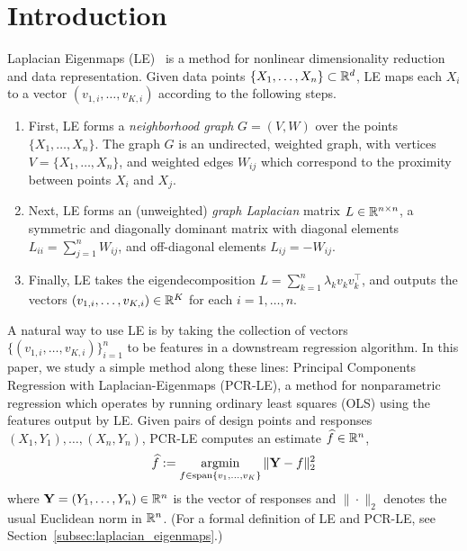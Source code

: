 \section{Introduction}
\label{sec:introduction}

Laplacian Eigenmaps (LE)~\citep{belkin03a} is a method for nonlinear dimensionality reduction and data representation. Given data points $\{X_1,\ldots,X_n\} \subset \mathbb{R}^d$, LE maps each $X_i$ to a vector $(v_{1,i},\ldots,v_{K,i})$ according to the following steps.
\begin{enumerate}
	\item First, LE forms a \emph{neighborhood graph} $G = (V,W)$ over the points $\{X_1,\ldots,X_n\}$. The graph $G$ is an undirected, weighted graph, with vertices $V = \{X_1,\ldots,X_n\}$, and weighted edges $W_{ij}$ which correspond to the proximity between points $X_i$ and $X_j$.
	\item Next, LE forms an (unweighted) \emph{graph Laplacian} matrix $L \in \mathbb{R}^{n \times n}$, a symmetric and diagonally dominant matrix with diagonal elements $L_{ii} = \sum_{j = 1}^{n} W_{ij}$, and off-diagonal elements $L_{ij} = -W_{ij}$. 
	\item Finally, LE takes the eigendecomposition $L = \sum_{k = 1}^{n} \lambda_k v_k v_k^{\top}$, and outputs the vectors $(v_{1,i},\ldots,v_{K,i}) \in \mathbb{R}^K$ for each $i = 1,\ldots,n$.
\end{enumerate} 
A natural way to use LE is by taking the collection of vectors $\{(v_{1,i},\ldots,v_{K,i})\}_{i = 1}^{n}$ to be features in a downstream regression algorithm. In this paper, we study a simple method along these lines: Principal Components Regression with Laplacian-Eigenmaps (PCR-LE), a method for nonparametric regression which operates by running ordinary least squares (OLS) using the features output by LE. Given pairs of design points and responses $(X_1,Y_1),\ldots, (X_n,Y_n)$, PCR-LE computes an estimate $\widehat{f} \in \mathbb{R}^n$,
\begin{equation}
\label{eqn:pcr-le}
\widehat{f} := \mathop{\mathrm{argmin}}_{f \in \mathrm{span}\{v_1,\ldots,v_K\}} \|{\bf Y} - f\|_2^2
\end{equation}
where ${\bf Y} = (Y_1,\ldots,Y_n) \in \mathbb{R}^n$ is the vector of responses and $\|\cdot\|_2$ denotes the usual Euclidean norm in $\mathbb{R}^n$. (For a formal definition of LE and PCR-LE, see Section~\ref{subsec:laplacian_eigenmaps}.)

